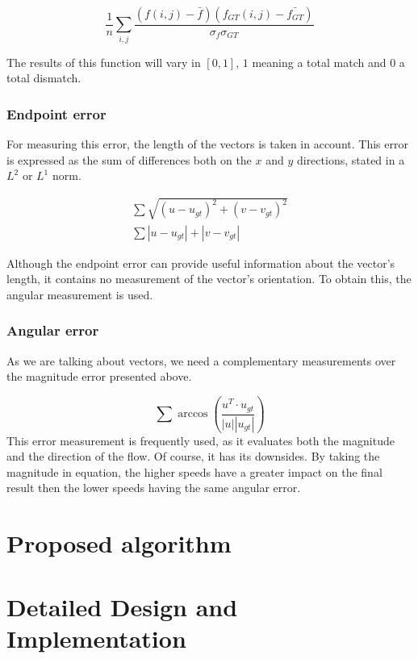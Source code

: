 \documentclass[12pt,a4paper,twoside]{report}
\begin{document}
\begin{equation}
\frac{1}{n}\sum_{i,j} \frac{(f(i,j) - \bar{f})(f_{GT}(i,j) - \bar{f_{GT}})}{\sigma_f \sigma_{GT}}
\end{equation}


The results of this function will vary in $[0,1]$, $1$ meaning a total match and $0$ a total dismatch.
\subsection{Endpoint error}
For measuring this error, the length of the vectors is taken in account. This error is expressed as the sum of differences both on the $x$ and $y$ directions, stated in a $L^2$ or $L^1$ norm.

\begin{equation}
\begin{split}
\sum  \sqrt{(u-u_{gt})^2+(v-v_{gt})^2} \\ 
\sum |u-u_{gt}|+|v-v_{gt}|
\end{split}
\end{equation}

Although the endpoint error can provide useful information about the vector's length, it contains no measurement of  the vector's orientation. To obtain this, the angular measurement is used.
\subsection{Angular error}
As we are talking about vectors, we need a complementary measurements over the magnitude error presented above.


\begin{equation}
\sum  \arccos \left( \frac{u^T \cdot u_{gt}}{|u||u_{gt}|}\right)
\end{equation}
 This error measurement is frequently used, as it evaluates both the magnitude and the direction of the flow. Of course, it has its downsides. By taking the magnitude in equation, the higher speeds have a greater impact on the final result then the lower speeds having the same angular error. 

\chapter{Proposed algorithm}

\chapter{Detailed Design and Implementation}
\end{document}
